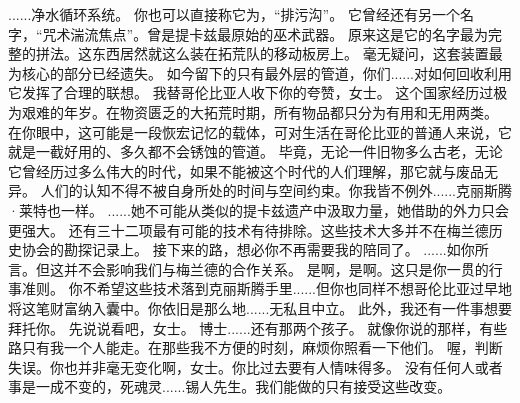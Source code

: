 \documentclass[openany]{book}
\begin{document}
\begin{dialogue}
     ......净水循环系统。
     你也可以直接称它为，“排污沟”。
     它曾经还有另一个名字，“咒术湍流焦点”。曾是提卡兹最原始的巫术武器。
     原来这是它的名字最为完整的拼法。这东西居然就这么装在拓荒队的移动板房上。
     毫无疑问，这套装置最为核心的部分已经遗失。
     如今留下的只有最外层的管道，你们......对如何回收利用它发挥了合理的联想。
     我替哥伦比亚人收下你的夸赞，女士。
     这个国家经历过极为艰难的年岁。在物资匮乏的大拓荒时期，所有物品都只分为有用和无用两类。
     在你眼中，这可能是一段恢宏记忆的载体，可对生活在哥伦比亚的普通人来说，它就是一截好用的、多久都不会锈蚀的管道。
     毕竟，无论一件旧物多么古老，无论它曾经历过多么伟大的时代，如果不能被这个时代的人们理解，那它就与废品无异。
     人们的认知不得不被自身所处的时间与空间约束。你我皆不例外......克丽斯腾·莱特也一样。
     ......她不可能从类似的提卡兹遗产中汲取力量，她借助的外力只会更强大。
     还有三十二项最有可能的技术有待排除。这些技术大多并不在梅兰德历史协会的勘探记录上。
     接下来的路，想必你不再需要我的陪同了。
     ......如你所言。但这并不会影响我们与梅兰德的合作关系。
     是啊，是啊。这只是你一贯的行事准则。
     你不希望这些技术落到克丽斯腾手里......但你也同样不想哥伦比亚过早地将这笔财富纳入囊中。你依旧是那么地......无私且中立。
     此外，我还有一件事想要拜托你。
     先说说看吧，女士。
     博士......还有那两个孩子。
     就像你说的那样，有些路只有我一个人能走。在那些我不方便的时刻，麻烦你照看一下他们。
     喔，判断失误。你也并非毫无变化啊，女士。你比过去要有人情味得多。
     没有任何人或者事是一成不变的，死魂灵......锡人先生。我们能做的只有接受这些改变。
\end{dialogue}
\end{document}
